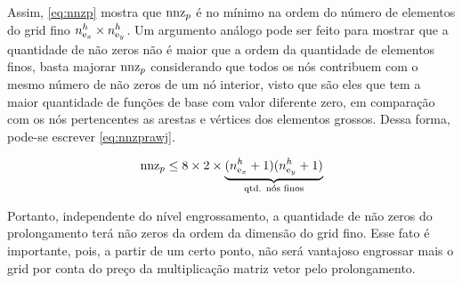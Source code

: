 Assim, \eqref{eq:nnzp} mostra que $\text{nnz}_p$ é no mínimo na ordem do número de elementos do grid fino $n_{\text{e}_x}^h\times n_{\text{e}_y}^h$. Um argumento análogo pode ser feito para mostrar que a quantidade de não zeros não é maior que a ordem da quantidade de elementos finos, basta majorar $\text{nnz}_p$ considerando que todos os nós contribuem com o mesmo número de não zeros de um nó interior, visto que são eles que tem a maior quantidade de funções de base com valor diferente zero, em comparação com os nós pertencentes as arestas e vértices dos elementos grossos. Dessa forma, pode-se escrever \eqref{eq:nnzprawj}.

\begin{equation}\label{eq:nnzprawj}
    \text{nnz}_p \le 8 \times 2 \times \underbrace{(n_{\text{e}_x}^h + 1)(n_{\text{e}_y}^h + 1)}_{\text{qtd. nós finos}}
\end{equation}


Portanto, independente do nível engrossamento, a quantidade de não zeros do prolongamento terá não zeros da ordem da dimensão do grid fino. Esse fato é importante, pois, a partir de um certo ponto, não será vantajoso engrossar mais o grid por conta do preço da multiplicação matriz vetor pelo prolongamento.